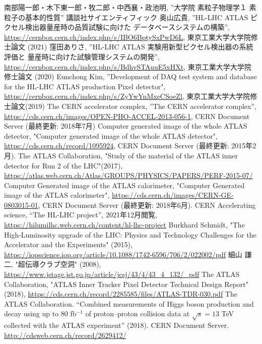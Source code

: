 \begin{thebibliography}{24}
南部陽一郎・木下東一郎・牧二郎・中西襄・政池明,
”大学院 素粒子物理学１ 素粒子の基本的性質”
講談社サイエンティフィック
奥山広貴, ”HL-LHC ATLAS ピクセル検出器量産時の品質試験に向けた データベースシステムの構築”,
\url{https://cernbox.cern.ch/index.php/s/IBO6BptySxPwD6L}, 東京工業大学大学院修士論文 (2021)
窪田ありさ, ”HL-LHC ATLAS 実験用新型ピクセル検出器の系統評価と 量産時に向けた試験管理システムの開発”,
\url{https://cernbox.cern.ch/index.php/s/BdhvSTAuuE5xHXt}, 東京工業大学大学院修士論文 (2020)
Eunchong Kim, ”Development of DAQ test system and database for the HL-LHC ATLAS production Pixel detector",
\url{https://cernbox.cern.ch/index.php/s/ZyYwYnMxeCSoeZl}, 東京工業大学大学院修士論文(2019)
The CERN accelerator complex, ”The CERN accelerator complex”, \url{https://cds.cern.ch/images/OPEN-PHO-ACCEL-2013-056-1}, CERN Document Server (最終更新: 2018年7月)
Computer generated image of the whole ATLAS detector, "Computer generated image of the whole ATLAS detector", \url{https://cds.cern.ch/record/1095924}, CERN Document Server (最終更新: 2015年2月).
The ATLAS Collaboration, "Study of the material of the ATLAS inner detector for Run 2 of the LHC"(2017), \url{https://atlas.web.cern.ch/Atlas/GROUPS/PHYSICS/PAPERS/PERF-2015-07/}
Computer Generated image of the ATLAS calorimeter, "Computer Generated image of the ATLAS calorimeter", \url{https://cds.cern.ch/images/CERN-GE-0803015-01}, CERN Document Server (最終更新: 2018年6月).
CERN Accelerating science, “The HL-LHC project”, 2021年12月閲覧,
\url{https://hilumilhc.web.cern.ch/content/hl-lhc-project}
Burkhard Schmidt, "The High-Luminosity upgrade of the LHC: Physics and Technology Challenges for the Accelerator and the Experiments" (2015),
\url{https://iopscience.iop.org/article/10.1088/1742-6596/706/2/022002/pdf}
細山 謙二, "超伝導クラブ空洞" (2008), \url{https://www.jstage.jst.go.jp/article/jcsj/43/4/43_4_132/_pdf}
The ATLAS Collaboration, "ATLAS Inner Tracker Pixel Detector Technical Design Report" (2018), \url{https://cds.cern.ch/record/2285585/files/ATLAS-TDR-030.pdf}
The ATLAS Collaboration. “Combined measurements of Higgs boson production and decay using up to $80$ fb$^{-1}$ of proton–proton collision data at $\sqrt{s}=13$ TeV collected with the ATLAS experiment” (2018). CERN Document Server. \url{http://cdsweb.cern.ch/record/2629412/}

\end{thebibliography}

